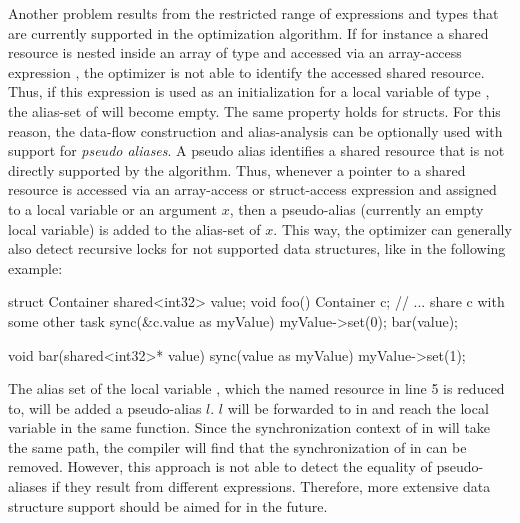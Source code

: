Another problem results from the restricted range of expressions and types that are currently supported in the optimization algorithm. If for instance a shared resource is nested inside an array  of type  and accessed via an array-access expression , the optimizer is not able to identify the accessed shared resource. Thus, if this expression is used as an initialization for a local variable  of type , the alias-set of  will become empty. The same property holds for structs. For this reason, the data-flow construction and alias-analysis can be optionally used with support for \textit{pseudo aliases}. A pseudo alias identifies a shared resource that is not directly supported by the algorithm. Thus, whenever a pointer to a shared resource is accessed via an array-access or struct-access expression and assigned to a local variable or an argument $x$, then a pseudo-alias (currently an empty local variable) is added to the alias-set of $x$. This way, the optimizer can generally also detect recursive locks for not supported data structures, like in the following example:
\begin{ccode}
struct Container { shared<int32> value; }
void foo() {
  Container c;
  // ... share c with some other task
  sync(&c.value as myValue) {
    myValue->set(0);
    bar(value);
  }
}

void bar(shared<int32>* value) {
  sync(value as myValue) { myValue->set(1); }
}
\end{ccode}
The alias set of the local variable , which the named resource in line 5 is reduced to, will be added a pseudo-alias $l$. $l$ will be forwarded to  in  and reach the local variable  in the same function. Since the synchronization context of  in  will take the same path, the compiler will find that the synchronization of  in  can be removed. However, this approach is not able to detect the equality of pseudo-aliases if they result from different expressions. Therefore, more extensive data structure support should be aimed for in the future.

